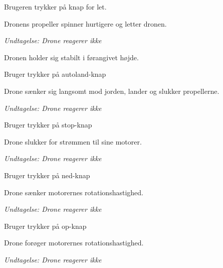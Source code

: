 \documentclass[Main]{subfiles}
\begin{document}
\begin{UseCase}

	\begin{normFor}
	\item Brugeren trykker på knap for let.
	\item Dronens propeller spinner hurtigere og letter dronen.
	\item[] \textit{Undtagelse: Drone reagerer ikke}
	\item Dronen holder sig stabilt i førangivet højde.
	\end{normFor} 
	
	\begin{normFor}
	\item Bruger trykker på autoland-knap
	\item Drone sænker sig langsomt mod jorden, lander og slukker propellerne.
	\item[] \textit{Undtagelse: Drone reagerer ikke}
	\end{normFor} 
	
	\begin{normFor}
	\item Bruger trykker på stop-knap
	\item Drone slukker for strømmen til sine motorer.
	\item[] \textit{Undtagelse: Drone reagerer ikke}
	\end{normFor} 
	
	\begin{normFor}
	\item Bruger trykker på ned-knap
	\item Drone sænker motorernes rotationshastighed.
	\item[] \textit{Undtagelse: Drone reagerer ikke}
	\end{normFor} 
	
	\begin{normFor}
	\item Bruger trykker på op-knap
	\item Drone forøger motorernes rotationshastighed.
	\item[] \textit{Undtagelse: Drone reagerer ikke}
	\end{normFor} 
	

\end{UseCase}
\end{document}
